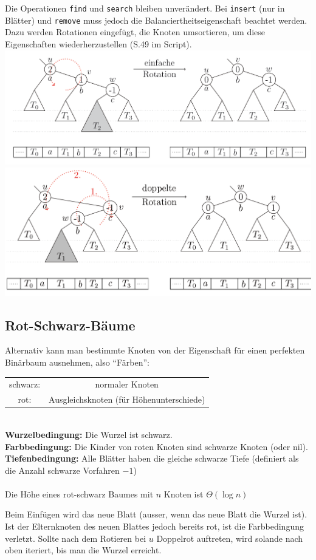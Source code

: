 \documentclass{scrartcl}
\begin{document}
Die Operationen \texttt{find} und \texttt{search} bleiben unverändert. Bei \texttt{insert} (nur in Blätter) und \texttt{remove} muss jedoch die Balanciertheitseigenschaft beachtet werden. Dazu werden Rotationen eingefügt, die Knoten umsortieren, um diese Eigenschaften wiederherzustellen (S.49 im Script). \\
\includegraphics[width=\textwidth]{images/AVL-einfacheRotation.png} \\
\includegraphics[width=\textwidth]{images/AVL-doppelteRotation.png}

\subsection{Rot-Schwarz-Bäume}
Alternativ kann man bestimmte Knoten von der Eigenschaft für einen perfekten Binärbaum ausnehmen, also "`Färben"':

\begin{shaded}
\begin{tabular}{cc}
schwarz: & normaler Knoten \\
rot: & Ausgleichsknoten (für Höhenunterschiede) \\
\end{tabular}\\
\textbf{Wurzelbedingung:} Die Wurzel ist schwarz. \\
\textbf{Farbbedingung:} Die Kinder von roten Knoten sind schwarze Knoten (oder nil). \\
\textbf{Tiefenbedingung:} Alle Blätter haben die gleiche schwarze Tiefe (definiert als die Anzahl schwarze Vorfahren $-1$) \\ \ \\
Die Höhe eines rot-schwarz Baumes mit $n$ Knoten ist $\Theta(\log n)$
\end{shaded}
Beim Einfügen wird das neue Blatt  (ausser, wenn das neue Blatt die Wurzel ist). Ist der Elternknoten des neuen Blattes jedoch bereits rot, ist die Farbbedingung verletzt. Sollte nach dem Rotieren bei $u$ Doppelrot auftreten, wird solande nach oben iteriert, bis man die Wurzel erreicht.\\
\end{document}

